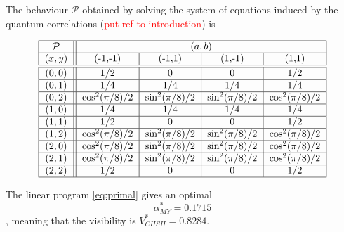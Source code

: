 The behaviour $\mathcal{P}$ obtained by solving the system of equations induced by the quantum correlations (\textcolor{red}{put ref to introduction}) is 

\begin{equation*}
    \begin{tabular}{|c||*{4}{c|}}\hline
  $\mathcal{P}$   & \multicolumn{4}{ c| }{$(a,b)$} \\
  \hline
$(x,y)$
&\makebox[3em]{(-1,-1)}&\makebox[3em]{(-1,1)}&\makebox[3em]{(1,-1)}&\makebox[3em]{(1,1)}\\\hline\hline

$(0,0)$ & $1/2$&$0$&$0$&$1/2$\\
\hline
$(0,1)$ &  $1/4$&$1/4$ &$1/4$&$1/4$ \\
\hline
$(0,2)$ & $\cos^2(\pi/8)/2$&$\sin^2(\pi/8)/2$&$\sin^2(\pi/8)/2$&$\cos^2(\pi/8)/2$ \\
\hline
$(1,0)$ & $1/4$&$1/4$&$1/4$&$1/4$ \\ 
\hline
$(1,1)$ & $1/2$&$0$&$0$&$1/2$ \\
\hline
$(1,2)$ &$\cos^2(\pi/8)/2$&$\sin^2(\pi/8)/2$&$\sin^2(\pi/8)/2$&$\cos^2(\pi/8)/2$ \\
\hline
$(2,0)$ & $\cos^2(\pi/8)/2$&$\sin^2(\pi/8)/2$&$\sin^2(\pi/8)/2$&$\cos^2(\pi/8)/2$ \\
\hline
$(2,1)$ & $\cos^2(\pi/8)/2$&$\sin^2(\pi/8)/2$&$\sin^2(\pi/8)/2$&$\cos^2(\pi/8)/2$ \\
\hline
$(2,2)$ & $1/2$&$0$&$0$&$1/2$ \\
 \hline
    \end{tabular}
    \end{equation*}

The linear program \ref{eq:primal} gives an optimal 
\begin{equation}
    \alpha^*_{MY} = 0.1715 
\end{equation}, meaning that the visibility is $V^*_{CHSH} = 0.8284$.


























